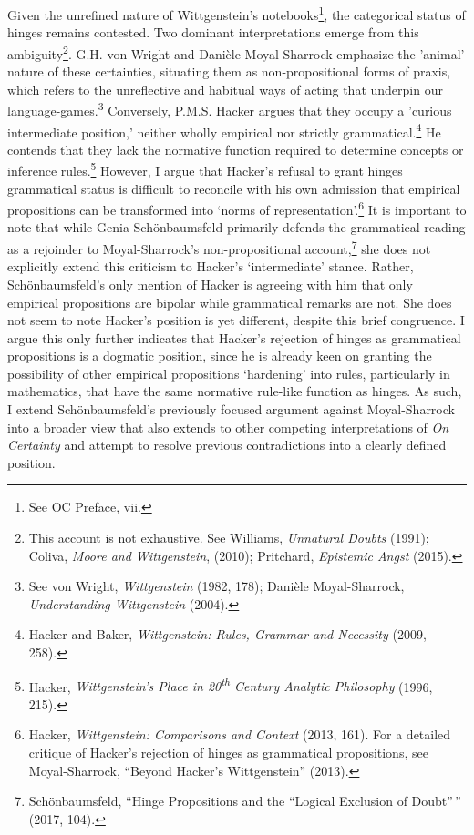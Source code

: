 Given the unrefined nature of Wittgenstein's notebooks\footnote{See OC
  Preface, vii.}, the categorical status of hinges remains contested.
Two dominant interpretations emerge from this ambiguity\footnote{This
  account is not exhaustive. See Williams, \emph{Unnatural Doubts}
  (1991); Coliva, \emph{Moore and Wittgenstein}, (2010); Pritchard,
  \emph{Epistemic Angst} (2015).}. G.H. von Wright and Danièle
Moyal-Sharrock emphasize the 'animal' nature of these certainties,
situating them as non-propositional forms of praxis, which refers to the
unreflective and habitual ways of acting that underpin our
language-games.\footnote{See von Wright, \emph{Wittgenstein} (1982,
  178); Danièle Moyal-Sharrock, \emph{Understanding Wittgenstein}
  (2004).} Conversely, P.M.S. Hacker argues that they occupy a 'curious
intermediate position,' neither wholly empirical nor strictly
grammatical.\footnote{Hacker and Baker, \emph{Wittgenstein: Rules,
  Grammar and Necessity} (2009, 258).} He contends that they lack the
normative function required to determine concepts or inference
rules.\footnote{Hacker, \emph{Wittgenstein's Place in
  20\textsuperscript{th} Century Analytic Philosophy} (1996, 215).}
However, I argue that Hacker's refusal to grant hinges grammatical
status is difficult to reconcile with his own admission that empirical
propositions can be transformed into `norms of
representation'.\footnote{Hacker, \emph{Wittgenstein: Comparisons and
  Context} (2013, 161). For a detailed critique of Hacker's rejection of
  hinges as grammatical propositions, see Moyal-Sharrock, ``Beyond
  Hacker's Wittgenstein'' (2013).} It is important to note that while
Genia Schönbaumsfeld primarily defends the grammatical reading as a
rejoinder to Moyal-Sharrock's non-propositional account,\footnote{Schönbaumsfeld,
  ``Hinge Propositions and the ``Logical Exclusion of Doubt''\,'' (2017,
  104).} she does not explicitly extend this criticism to Hacker's
`intermediate' stance. Rather, Schönbaumsfeld's only mention of Hacker
is agreeing with him that only empirical propositions are bipolar while
grammatical remarks are not. She does not seem to note Hacker's position
is yet different, despite this brief congruence. I argue this only
further indicates that Hacker's rejection of hinges as grammatical
propositions is a dogmatic position, since he is already keen on
granting the possibility of other empirical propositions `hardening'
into rules, particularly in mathematics, that have the same normative
rule-like function as hinges. As such, I extend Schönbaumsfeld's
previously focused argument against Moyal-Sharrock into a broader view
that also extends to other competing interpretations of \emph{On
Certainty} and attempt to resolve previous contradictions into a clearly
defined position.

